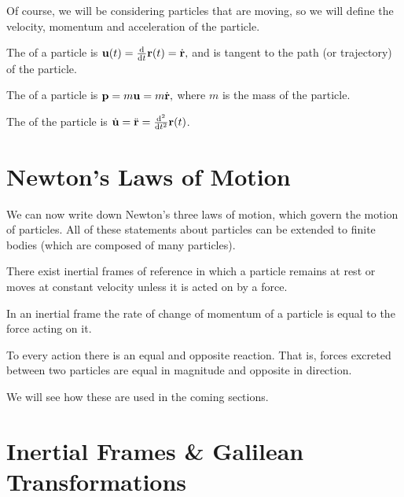 \documentclass[a4paper]{scrreprt}
\begin{document}
Of course, we will be considering particles that are moving, so we will define the velocity, momentum and acceleration of the particle.

\begin{definition}[Velocity]
	The  of a particle is
	$
	\mathbf{u}(t) = \frac{\mathrm{d}}{\mathrm{d}t} \mathbf{r}(t) = \dot{\mathbf{r}},
	$
	and is tangent to the path (or trajectory) of the particle.
\end{definition}

\begin{definition}[Momentum]
	The  of a particle is
	$
	\mathbf{p} = m \mathbf{u} = m \dot{\mathbf{r}},
	$
	where $m$ is the mass of the particle.
\end{definition}

\begin{definition}[Acceleration]
	The  of the particle is $\dot{\mathbf{u}} = \ddot{\mathbf{r}} = \frac{\mathrm{d}^2}{\mathrm{d}t^2} \mathbf{r}(t)$.
\end{definition}

\section{Newton's Laws of Motion}

We can now write down Newton's three laws of motion, which govern the motion of particles. All of these statements about particles can be extended to finite bodies (which are composed of many particles).

\begin{law*}
There exist inertial frames of reference in which a particle remains at rest or moves at constant velocity unless it is acted on by a force.
\end{law*}

\begin{law*}
	In an inertial frame the rate of change of momentum of a particle is equal to the force acting on it.
\end{law*}

\begin{law*}
To every action there is an equal and opposite reaction. That is, forces excreted between two particles are equal in magnitude and opposite in direction.
\end{law*}

We will see how these are used in the coming sections.

\section{Inertial Frames \& Galilean Transformations}
\end{document}
